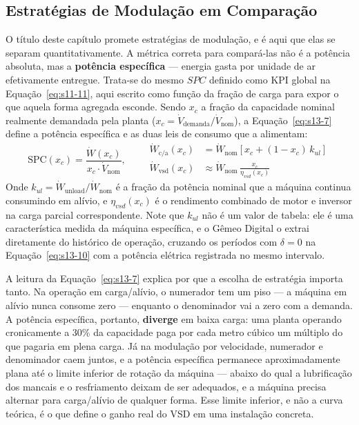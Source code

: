 \documentclass[12pt,a4paper]{article}
\numberwithin{equation}{section}
\numberwithin{table}{section}
\numberwithin{figure}{section}
\begin{document}
{	\subsection{\textbf{Estratégias de Modulação em Comparação}}
	O título deste capítulo promete estratégias de modulação, e é aqui que elas se separam quantitativamente. A métrica correta para compará-las não é a potência absoluta, mas a \textbf{potência específica} — energia gasta por unidade de ar efetivamente entregue. Trata-se do mesmo $SPC$ definido como KPI global na Equação~\eqref{eq:s11-11}, aqui escrito como função da fração de carga para expor o que aquela forma agregada esconde. Sendo $x_c$ a fração da capacidade nominal realmente demandada pela planta ($x_c = \dot{V}_{\text{demanda}}/\dot{V}_{\text{nom}}$), a Equação~\eqref{eq:s13-7} define a potência específica e as duas leis de consumo que a alimentam:
	\begin{equation}\label{eq:s13-7}
	\text{SPC}(x_c) = \frac{\dot{W}(x_c)}{x_c \cdot \dot{V}_{\text{nom}}}, \qquad
	\begin{aligned}
	\dot{W}_{\text{c/a}}(x_c) &= \dot{W}_{\text{nom}} \left[ x_c + (1 - x_c) \, k_{ul} \right] \\
	\dot{W}_{\text{vsd}}(x_c) &\approx \dot{W}_{\text{nom}} \, \frac{x_c}{\eta_{vsd}(x_c)}
	\end{aligned}
	\end{equation}
	Onde $k_{ul} = \dot{W}_{\text{unload}}/\dot{W}_{\text{nom}}$ é a fração da potência nominal que a máquina continua consumindo em alívio, e $\eta_{vsd}(x_c)$ é o rendimento combinado de motor e inversor na carga parcial correspondente. Note que $k_{ul}$ não é um valor de tabela: ele é uma característica medida da máquina específica, e o Gêmeo Digital o extrai diretamente do histórico de operação, cruzando os períodos com $\delta = 0$ na Equação~\eqref{eq:s13-10} com a potência elétrica registrada no mesmo intervalo.

	A leitura da Equação~\eqref{eq:s13-7} explica por que a escolha de estratégia importa tanto. Na operação em carga/alívio, o numerador tem um piso — a máquina em alívio nunca consome zero — enquanto o denominador vai a zero com a demanda. A potência específica, portanto, \textbf{diverge} em baixa carga: uma planta operando cronicamente a 30\% da capacidade paga por cada metro cúbico um múltiplo do que pagaria em plena carga. Já na modulação por velocidade, numerador e denominador caem juntos, e a potência específica permanece aproximadamente plana até o limite inferior de rotação da máquina — abaixo do qual a lubrificação dos mancais e o resfriamento deixam de ser adequados, e a máquina precisa alternar para carga/alívio de qualquer forma. Esse limite inferior, e não a curva teórica, é o que define o ganho real do VSD em uma instalação concreta.

}
\end{document}
